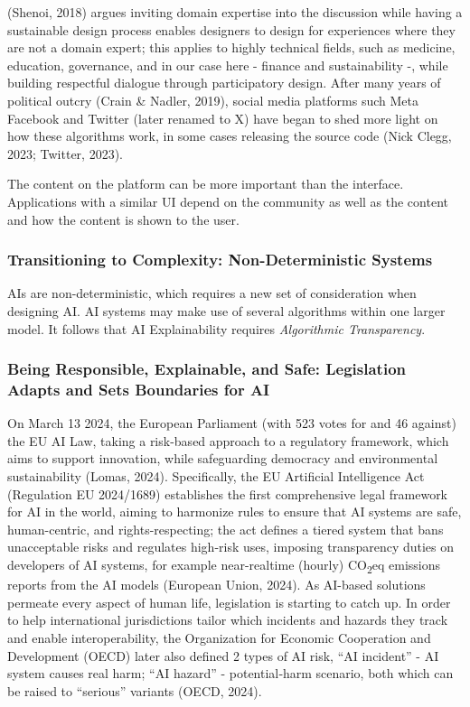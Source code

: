 \documentclass[
  letterpaper,
  DIV=11,
  numbers=noendperiod]{scrartcl}
\begin{document}
(Shenoi, 2018) argues inviting domain expertise into the discussion
while having a sustainable design process enables designers to design
for experiences where they are not a domain expert; this applies to
highly technical fields, such as medicine, education, governance, and in
our case here - finance and sustainability -, while building respectful
dialogue through participatory design. After many years of political
outcry (Crain \& Nadler, 2019), social media platforms such Meta
Facebook and Twitter (later renamed to X) have began to shed more light
on how these algorithms work, in some cases releasing the source code
(Nick Clegg, 2023; Twitter, 2023).

The content on the platform can be more important than the interface.
Applications with a similar UI depend on the community as well as the
content and how the content is shown to the user.

\subsubsection{Transitioning to Complexity: Non-Deterministic
Systems}\label{transitioning-to-complexity-non-deterministic-systems}

AIs are non-deterministic, which requires a new set of consideration
when designing AI. AI systems may make use of several algorithms within
one larger model. It follows that AI Explainability requires
\emph{Algorithmic Transparency}.

\subsubsection{Being Responsible, Explainable, and Safe: Legislation
Adapts and Sets Boundaries for
AI}\label{being-responsible-explainable-and-safe-legislation-adapts-and-sets-boundaries-for-ai}

On March 13 2024, the European Parliament (with 523 votes for and 46
against) the EU AI Law, taking a risk-based approach to a regulatory
framework, which aims to support innovation, while safeguarding
democracy and environmental sustainability (Lomas, 2024). Specifically,
the EU Artificial Intelligence Act (Regulation EU 2024/1689) establishes
the first comprehensive legal framework for AI in the world, aiming to
harmonize rules to ensure that AI systems are safe, human-centric, and
rights-respecting; the act defines a tiered system that bans
unacceptable risks and regulates high-risk uses, imposing transparency
duties on developers of AI systems, for example near-realtime (hourly)
CO\textsubscript{2}eq emissions reports from the AI models (European
Union, 2024). As AI-based solutions permeate every aspect of human life,
legislation is starting to catch up. In order to help international
jurisdictions tailor which incidents and hazards they track and enable
interoperability, the Organization for Economic Cooperation and
Development (OECD) later also defined 2 types of AI risk, ``AI
incident'' - AI system causes real harm; ``AI hazard'' - potential‐harm
scenario, both which can be raised to ``serious'' variants (OECD, 2024).
\end{document}
